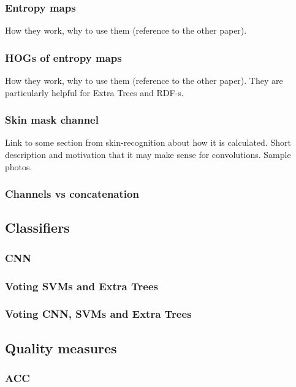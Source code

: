         \subsubsection*{Entropy maps}
        How they work, why to use them (reference to the other paper).

        \subsubsection*{HOGs of entropy maps}
        How they work, why to use them (reference to the other paper). They
        are particularly helpful for Extra Trees and RDF-s.

        \subsubsection*{Skin mask channel}
        Link to some section from skin-recognition about how it is calculated.
        Short description and motivation that it may make sense for
        convolutions.
        Sample photos.

        \subsubsection*{Channels vs concatenation}


    \subsection{Classifiers}
        \subsubsection*{CNN}

        \subsubsection*{Voting SVMs and Extra Trees}

        \subsubsection*{Voting CNN, SVMs and Extra Trees}

    \subsection{Quality measures}
        \subsubsection*{ACC}

